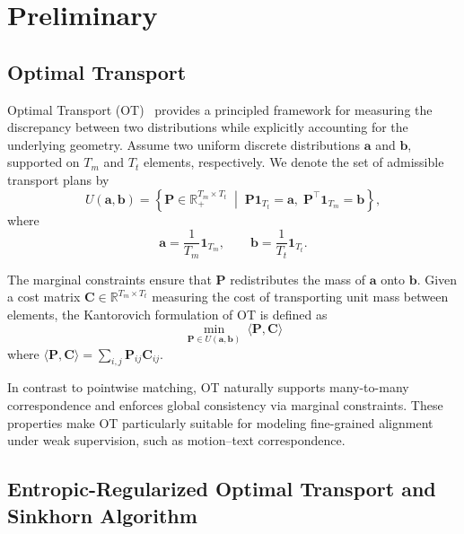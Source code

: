 
\section{Preliminary}
\subsection{Optimal Transport}
Optimal Transport (OT)~\cite{solomon2018optimal} provides a principled framework for measuring the
discrepancy between two distributions while explicitly accounting for the
underlying geometry. Assume two uniform discrete distributions $\mathbf{a}$ and $\mathbf{b}$, supported on $T_m$ and $T_t$ elements, respectively. We denote the set of admissible transport plans by
\begin{equation}
\label{eq:P_constraint}
U(\mathbf{a},\mathbf{b})=
\left\{
\mathbf{P} \in \mathbb{R}_+^{T_m \times T_t}
\;\middle|\;
\mathbf{P}\mathbf{1}_{T_t}=\mathbf{a},\;
\mathbf{P}^\top \mathbf{1}_{T_m}=\mathbf{b}
\right\},
\end{equation}
where
\begin{equation}
\mathbf{a}=\frac{1}{T_m}\mathbf{1}_{T_m},
\qquad
\mathbf{b}=\frac{1}{T_t}\mathbf{1}_{T_t}.
\end{equation}

The marginal constraints ensure that $\mathbf{P}$ redistributes the mass of $\mathbf{a}$ onto $\mathbf{b}$.
Given a cost matrix $\mathbf{C}\in\mathbb{R}^{T_m\times T_t}$ measuring the cost of
transporting unit mass between elements, the Kantorovich formulation of OT is
defined as
\begin{equation}
\label{eq:ot_kantorovich}
\min_{\mathbf{P}\in{U}(\mathbf{a},\mathbf{b})}
\ \langle \mathbf{P},\mathbf{C}\rangle
\end{equation}
where $\langle \mathbf{P},\mathbf{C}\rangle=\sum_{i,j}\mathbf{P}_{ij}\mathbf{C}_{ij}$.

In contrast to pointwise matching, OT naturally supports many-to-many
correspondence and enforces global consistency via marginal constraints.
These properties make OT particularly suitable for modeling fine-grained
alignment under weak supervision, such as motion--text correspondence.

\subsection{Entropic-Regularized Optimal Transport and Sinkhorn Algorithm}
\label{sec:entro}

